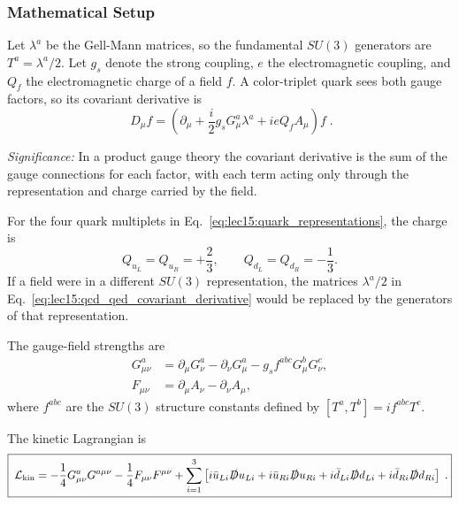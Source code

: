 \subsubsection*{Mathematical Setup}

Let $\lambda^a$ be the Gell-Mann matrices, so the fundamental $SU(3)$ generators are $T^a=\lambda^a/2$. Let $g_s$ denote the strong coupling, $e$ the electromagnetic coupling, and $Q_f$ the electromagnetic charge of a field $f$. A color-triplet quark sees both gauge factors, so its covariant derivative is
\begin{equation}
  \boxed{\;D_\mu f
  =\left(\partial_\mu+\frac{i}{2}g_sG_\mu^a\lambda^a+i e Q_f A_\mu\right)f\; .}
  \label{eq:lec15:qcd_qed_covariant_derivative}
\end{equation}

\textit{Significance:} In a product gauge theory the covariant derivative is the sum of the gauge connections for each factor, with each term acting only through the representation and charge carried by the field.

For the four quark multiplets in Eq.~\eqref{eq:lec15:quark_representations}, the charge is
\begin{equation}
  Q_{u_L}=Q_{u_R}=+\frac23,\qquad
  Q_{d_L}=Q_{d_R}=-\frac13 .
  \label{eq:lec15:quark_charges}
\end{equation}
If a field were in a different $SU(3)$ representation, the matrices $\lambda^a/2$ in Eq.~\eqref{eq:lec15:qcd_qed_covariant_derivative} would be replaced by the generators of that representation.

The gauge-field strengths are
\begin{align}
  G_{\mu\nu}^a
  &=\partial_\mu G_\nu^a-\partial_\nu G_\mu^a
    -g_sf^{abc}G_\mu^bG_\nu^c,
  \label{eq:lec15:gluon_field_strength}\\
  F_{\mu\nu}
  &=\partial_\mu A_\nu-\partial_\nu A_\mu,
  \label{eq:lec15:photon_field_strength}
\end{align}
where $f^{abc}$ are the $SU(3)$ structure constants defined by $[T^a,T^b]=if^{abc}T^c$.

The kinetic Lagrangian is
\begin{align}
  \boxed{\;
  \mathcal{L}_{\mathrm{kin}}
  =-\frac14G_{\mu\nu}^aG^{a\mu\nu}
   -\frac14F_{\mu\nu}F^{\mu\nu}
   +\sum_{i=1}^3\left[
     i\bar u_{Li}\slashed D u_{Li}
    +i\bar u_{Ri}\slashed D u_{Ri}
    +i\bar d_{Li}\slashed D d_{Li}
    +i\bar d_{Ri}\slashed D d_{Ri}
   \right]\; .}
  \label{eq:lec15:qcd_qed_kinetic_lagrangian}
\end{align}

